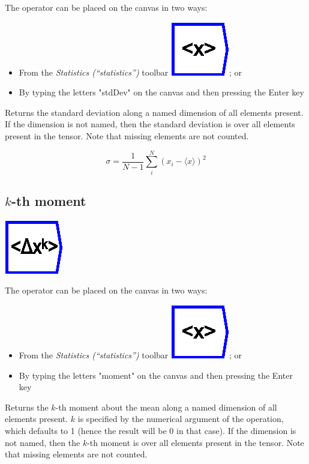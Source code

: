 The operator can be placed on the canvas in two ways:
\begin{itemize}
\item From the \emph{Statistics (``statistics'')} toolbar \includegraphics{images/mean};
or 
\item By typing the letters "stdDev" on the canvas and then pressing the
Enter key
\end{itemize}
Returns the standard deviation along a named dimension of all elements
present. If the dimension is not named, then the standard deviation
is over all elements present in the tensor. Note that missing elements
are not counted.

\[
\sigma=\frac{1}{N-1}\sum_{i}^{N}(x_{i}-\langle x\rangle)^{2}
\]


\subsection{$k$-th moment}

\label{Operation:moment}

\includegraphics{images/moment}

The operator can be placed on the canvas in two ways:
\begin{itemize}
\item From the \emph{Statistics (``statistics'')} toolbar \includegraphics{images/mean};
or 
\item By typing the letters "moment" on the canvas and then pressing the
Enter key
\end{itemize}
Returns the $k$-th moment about the mean along a named dimension
of all elements present. $k$ is specified by the numerical argument
of the operation, which defaults to 1 (hence the result will be 0
in that case). If the dimension is not named, then the $k$-th moment
is over all elements present in the tensor. Note that missing elements
are not counted.

